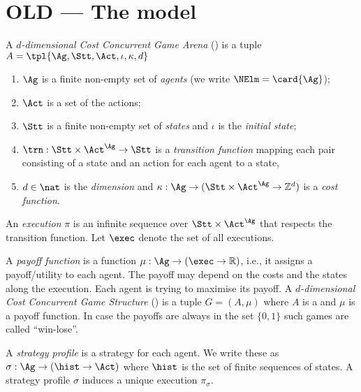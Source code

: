 \section{OLD --- The model}


	
		\begin{definition}[CCGS]
		A \emph{$d$-dimensional Cost Concurrent Game Arena} (\CCGA) is a
		tuple $A=\tpl{\Ag, \Stt, \Act,\iota,\kappa,d}$
		\begin{enumerate} \item $\Ag$ is a finite non-empty set of \emph{agents} (we write 
			$\NElm			= \card{\Ag}$);
			\item $\Act$ is a set of the actions;
			\item $\Stt$ is a finite non-empty set of \emph{states} and $\iota$
						is the \emph{initial state};
			\item $\trn: \Stt \times \Act^{\Ag} \rightarrow \Stt$ is
						a \emph{transition function} mapping each pair consisting of a
						state and an action for each agent to a state,
			\item $d \in \nat$ is the {\em dimension} and $\kappa: \Ag \to (\Stt \times \Act^{\Ag} \rightarrow \mathbb{Z}^d)$ is a \emph{cost function}.
		\end{enumerate}
		\end{definition}


An \emph{execution} $\pi$ is an infinite sequence over $\Stt \times \Act^{\Ag}$ that
respects the transition function.  Let $\exec$ denote the set of all
executions. 

A {\em payoff function} is a function $\mu: \Ag \to (\exec \to \mathbb{R})$, i.e., it
assigns a payoff/utility to each agent.  The payoff may depend on the costs and
the states along the execution. Each agent is trying to maximise its payoff.
A \emph{$d$-dimensional Cost Concurrent Game Structure} (\CCGS) is a tuple $G = (A,\mu)$ where $A$ is a \CCGA and $\mu$ is a payoff function.
In case the payoffs are always in the set $\{0,1\}$ such games are called ``win-lose''.

A \emph{strategy profile} is a strategy for each agent. We write these as $\sigma: \Ag \to (\hist \to \Act)$ where $\hist$ is the set of finite sequences of states.
A strategy profile $\sigma$ induces a unique execution $\pi_\sigma$.


